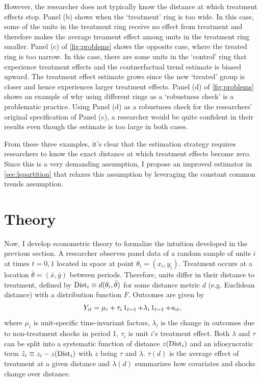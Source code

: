 However, the researcher does not typically know the distance at which treatment effects stop. Panel (b) shows when the `treatment' ring is too wide. In this case, some of the units in the treatment ring receive no effect from treatment and therefore makes the average treament effect among units in the treatment ring smaller. Panel (c) of \autoref{fig:problems} shows the opposite case, where the treated ring is too narrow. In this case, there are some units in the `control' ring that experience treatment effects and the coutnerfactual trend estimate is biased upward. The treatment effect estimate grows since the new `treated' group is closer and hence experiences larger treatment effects. Panel (d) of \autoref{fig:problems} shows an example of why using different rings as a `robustness check' is a problematic practice. Using Panel (d) as a robustness check for the researchers' original specification of Panel (c), a researcher would be quite confident in their results even though the estimate is too large in both cases.

From these three examples, it's clear that the estimation strategy requires researchers to know the exact distance at which treatment effects become zero. Since this is a very demanding assumption, I propose an improved estimator in \autoref{sec:lspartition} that relaxes this assumption by leveraging the constant common trends assumption. 




\section{Theory}

Now, I develop econometric theory to formalize the intuition developed in the previous section. A researcher observes panel data of a random sample of units $i$ at times $t = 0, 1$ located in space at point $\theta_i = (x_i, y_i)$. Treatment occurs at a location $\bar{\theta} = (\bar{x}, \bar{y})$ between periods. Therefore, units differ in their distance to treatment, defined by $\text{Dist}_i \equiv d(\theta_i, \bar{\theta})$ for some distance metric $d$ (e.g. Euclidean distance) with a distribution function $F$. Outcomes are given by 
\begin{equation}
    Y_{it} = \mu_i + \tau_i \one_{t = 1} + \lambda_i \one_{t=1} +u_{it},    
\end{equation}
where $\mu_i$ is unit-specific time-invariant factors, $\lambda_i$ is the change in outcomes due to non-treatment shocks in period 1, $\tau_i$ is unit $i$'s treatment effect. Both $\lambda$ and $\tau$ can be split into a systematic function of distance $z(\text{Dist}_i)$ and an idiosyncratic term $\tilde{z}_i \equiv z_i - z(\text{Dist}_i)$ with $z$ being $\tau$ and $\lambda$. $\tau(d)$ is the average effect of treatment at a given distance and $\lambda(d)$ summarizes how covariates and shocks change over distance.

